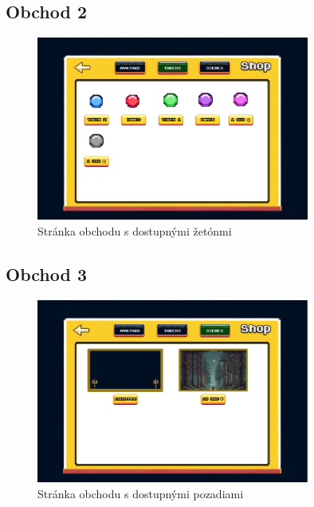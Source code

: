 \documentclass[a4paper, 11pt, onecolumn]{article}
\begin{document}
\subsection*{Obchod 2}
\begin{figure}[H]
  \centering
  \includegraphics[width=0.8\textwidth]{ShopTokens.png}
  \caption{Stránka obchodu s dostupnými žetónmi}
  \label{fig:shopTokens}
\end{figure}

\subsection*{Obchod 3}
\begin{figure}[H]
  \centering
  \includegraphics[width=0.8\textwidth]{ShopBack.png}
  \caption{Stránka obchodu s dostupnými pozadiami}
  \label{fig:shopBack}
\end{figure}
\end{document}
